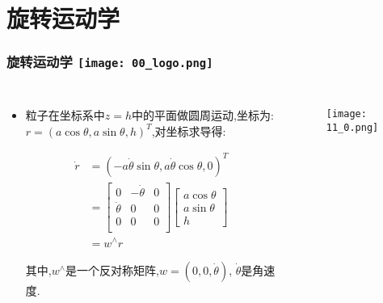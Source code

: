 \section{旋转运动学}

\begin{comment}
\end{comment}
\begin{frame}
\frametitle{旋转运动学 \hfill \texttt{[image: 00\_logo.png]}}
\begin{columns}
  
	\begin{itemize}
		\item 粒子在坐标系中$z=h$中的平面做圆周运动,坐标为:$r=(a\cos\theta, a \sin \theta, h)^T$,对坐标求导得:

    \begin{equation}
      \begin{split}
        \dot{r} &= (-a \dot{\theta} \sin \theta, a\dot{\theta}\cos\theta, 0)^T \\ 
          &= \begin{bmatrix}
        0 & -\dot{\theta} & 0 \\
        \dot{\theta} & 0 & 0 \\
        0 & 0 & 0 \\
      \end{bmatrix}
      \begin{bmatrix}
        a\cos\theta \\ a\sin\theta \\ h
      \end{bmatrix} \\
      &= w^\land r
      \end{split}
    \end{equation}

    其中,$w^\land$是一个反对称矩阵,$w = (0, 0, \dot{\theta})$, $\dot{\theta}$是角速度.

    


  \end{itemize}
  
	\begin{figure}[h]
		\texttt{[image: 11\_0.png]}
  \end{figure}
  

\end{columns}
\end{frame}

